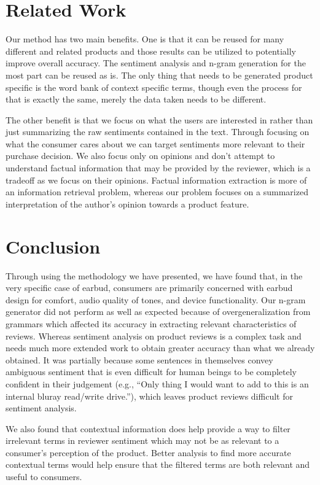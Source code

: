 \documentclass{article}
\begin{document}
\section{Related Work}
Our method has two main benefits. One is that it can be reused for many different and related products and those results can be utilized to potentially improve overall accuracy. The sentiment analysis and n-gram generation for the most part can be reused as is. The only thing that needs to be generated product specific is the word bank of context specific terms, though even the process for that is exactly the same, merely the data taken needs to be different.

The other benefit is that we focus on what the users are interested in rather than just summarizing the raw sentiments contained in the text. Through focusing on what the consumer cares about we can target sentiments more relevant to their purchase decision. We also focus only on opinions and don’t attempt to understand factual information that may be provided by the reviewer, which is a tradeoff as we focus on their opinions. Factual information extraction is more of an information retrieval problem, whereas our problem focuses on a summarized interpretation of the author’s opinion towards a product feature.

\section{Conclusion}
Through using the methodology we have presented, we have found that, in the very specific case of earbud, consumers are primarily concerned with earbud design for comfort, audio quality of tones, and device functionality. Our n-gram generator did not perform as well as expected because of overgeneralization from grammars which affected its accuracy in extracting relevant characteristics of reviews. Whereas sentiment analysis on product reviews is a complex task and needs much more extended work to obtain greater accuracy than what we already obtained. It was partially because some sentences in themselves convey ambiguous sentiment that is even difficult for human beings to be completely confident in their judgement (e.g., “Only thing I would want to add to this is an internal bluray read/write drive.”), which leaves product reviews difficult for sentiment analysis.

We also found that contextual information does help provide a way to filter irrelevant terms in reviewer sentiment which may not be as relevant to a consumer’s perception of the product. Better analysis to find more accurate contextual terms would help ensure that the filtered terms are both relevant and useful to consumers.
\end{document}
